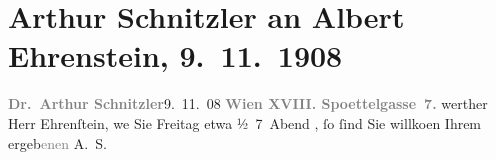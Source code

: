 

         
         \renewcommand{\erwaehntePersonen}{Personen: Albert Ehrenstein}
         \renewcommand{\erwaehnteOrte}{Orte: Edmund-Weiß-Gasse, Wien}
         \renewcommand{\erwaehnteWerke}{}
               \section[Arthur Schnitzler an Albert Ehrenstein, 9. 11. 1908]{ Arthur Schnitzler an Albert Ehrenstein, 9. 11. 1908}\nopagebreak{}\rehead{ }\begin{ledgroupsized}[t]{13cm}\normalsize\beginnumbering{} \toendnotes[C]{\smallbreak\pagebreak[2]} 
\toendnotes[C]{\smallbreak}\pstart
           \noindent{}{\pb}\textcolor{gray}{\textbf{Dr. Arthur Schnitzler}}\hfill 9. 11. 08\pend
           \pstart
           \textcolor{gray}{\textbf{Wien XVIII. Spoettelgasse 7.}}\pend
           \pstart{}werther Herr Ehrenſtein,\pend\pstart
           we{\geminationn}{ }Sie Freitag etwa
                  ½ 7 Abend{ }\label{K_L01798-1v}\label{K_L01798-1h}, ſo
               ſind Sie willko{\geminationm}en Ihrem\pend
           \pstart ergeb\textcolor{gray}{enen}{ }\spacefill\mbox{A. S.}\pend{}
         
         \endnumbering{}\end{ledgroupsized}  \newcommand{\dateiname}{L01798}\newcommand{\titel}{Arthur Schnitzler an Albert Ehrenstein, 9. 11. 1908}\newcommand{\editorInnen}{Martin Anton Müller und Gerd-Hermann Susen}
      